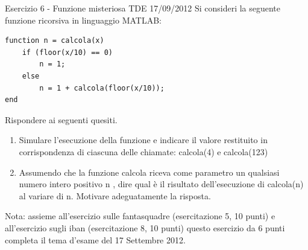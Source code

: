 \documentclass[handout]{beamer}
\begin{document}
\begin{frame}{Esercizio 6 - Funzione misteriosa TDE 17/09/2012}
	Si consideri la seguente funzione ricorsiva in linguaggio MATLAB:
	\begin{lstlisting}
function n = calcola(x)
	if (floor(x/10) == 0)
		n = 1;
	else
		n = 1 + calcola(floor(x/10));
end
\end{lstlisting}
	
	Rispondere ai seguenti quesiti.
	\begin{enumerate}
		\item Simulare l'esecuzione della funzione e indicare il valore restituito in corrispondenza di ciascuna delle
		chiamate: calcola(4) e calcola(123)
		\item 
		Assumendo che la funzione calcola riceva come parametro un qualsiasi numero intero positivo n , dire qual
		è il risultato dell'esecuzione di calcola(n) al variare di n. Motivare adeguatamente la risposta.
	\end{enumerate}

\alert{Nota:} assieme all'esercizio sulle fantasquadre (esercitazione 5, 10 punti) e all'esercizio sugli iban (esercitazione 8, 10 punti) questo esercizio da 6 punti completa il tema d'esame del 17 Settembre 2012.
\end{frame}
\end{document}
